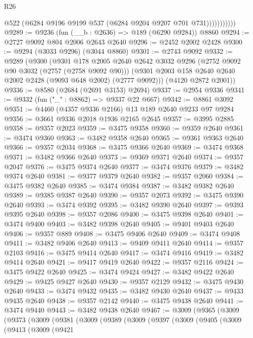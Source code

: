\begin{lexlean}{R26}
\begin{coremodule}
                      @522
                      (@6284 @9196 @9199 @537 (@6284 @9204 @9207 @701 @731)))))))))))
@9289 := @9236 (fun (__b : @2636) => @189 (@6290 @9284)) @8860
@9294 := @2727 @9092 @804 @2006 @2643 @2640
@9296 := @2452 @2002 @2428
@9300 := @9294 (@3033 @9296) (@3044 @8860)
@9301 := @2743 @9092
@9332 := @9289
    (@9300
      (@9301
        @178
        @2005
        @2640
        @2642
        @3032
        @9296
        (@2752 @9092 @90 @3032 (@2757 (@2758 @9092 @90)))
        (@9301 @2003 @158 @2640 @2640 @2002 @2428 (@9093 @648 @2002) (@2777 @9092)))
      (@4120 @2872 @2001))
@9336 := @8580 (@2684 (@2691 @3153) @2694)
@9337 := @2954 @9336
@9341 := @9332 (fun ("_" : @8862) => @9337 @22 @667)
@9342 := @8861 @3092
@9351 := @4460 (@4357 @9336 @2166) @13 @189 @2640 @9233 @97 @9284
@9356 := @3661 @9336 @2018 @1936 @2165 @2645
@9357 := @3995 @2885
@9358 := @9357 @2023
@9359 := @3475 @9358
@9360 := @9359 @2640
@9361 := @3474 @9360
@9363 := @3482 @9358 @2640
@9365 := @9361 @9363 @2640
@9366 := @9357 @2034
@9368 := @3475 @9366 @2640
@9369 := @3474 @9368
@9371 := @3482 @9366 @2640
@9373 := @9369 @9371 @2640
@9374 := @9357 @2047
@9376 := @3475 @9374 @2640
@9377 := @3474 @9376
@9379 := @3482 @9374 @2640
@9381 := @9377 @9379 @2640
@9382 := @9357 @2060
@9384 := @3475 @9382 @2640
@9385 := @3474 @9384
@9387 := @3482 @9382 @2640
@9389 := @9385 @9387 @2640
@9390 := @9357 @2073
@9392 := @3475 @9390 @2640
@9393 := @3474 @9392
@9395 := @3482 @9390 @2640
@9397 := @9393 @9395 @2640
@9398 := @9357 @2086
@9400 := @3475 @9398 @2640
@9401 := @3474 @9400
@9403 := @3482 @9398 @2640
@9405 := @9401 @9403 @2640
@9406 := @9357 @889
@9408 := @3475 @9406 @2640
@9409 := @3474 @9408
@9411 := @3482 @9406 @2640
@9413 := @9409 @9411 @2640
@9414 := @9357 @2103
@9416 := @3475 @9414 @2640
@9417 := @3474 @9416
@9419 := @3482 @9414 @2640
@9421 := @9417 @9419 @2640
@9422 := @9357 @2116
@9424 := @3475 @9422 @2640
@9425 := @3474 @9424
@9427 := @3482 @9422 @2640
@9429 := @9425 @9427 @2640
@9430 := @9357 @2129
@9432 := @3475 @9430 @2640
@9433 := @3474 @9432
@9435 := @3482 @9430 @2640
@9437 := @9433 @9435 @2640
@9438 := @9357 @2142
@9440 := @3475 @9438 @2640
@9441 := @3474 @9440
@9443 := @3482 @9438 @2640
@9467 := @3009
    (@9365
      (@3009
        (@9373
          (@3009
            (@9381
              (@3009
                (@9389
                  (@3009
                    (@9397
                      (@3009
                        (@9405
                          (@3009
                            (@9413
                              (@3009
                                (@9421

\end{coremodule}
\end{lexlean}

